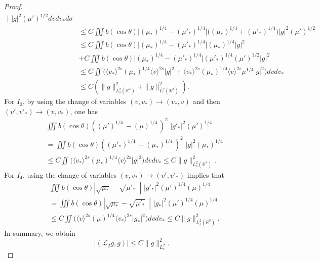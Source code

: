 \documentclass{amsart}[12pt, article]
\begin{document}
\begin{proof}
\begin{align*}
|\,\, |g|^2
(\mu')^{1/2}dv dv_* d\sigma\\
&\leq C  \iiint b(\cos\theta)\Big| (\mu_*)^{1/4} - (\mu'_*)^{1/4}
\Big| \Big( (\mu_*)^{1/4} + (\mu'_*)^{1/4} \Big)
|g|^2 (\mu')^{1/2}\\
&\leq C \iiint b(\cos\theta) \Big|(\mu_*)^{1/4} -
(\mu'_*)^{1/4}\Big|
(\mu_*)^{1/4} |g|^2 \\
&+ C\iiint b(\cos\theta) \Big|(\mu_*)^{1/4} -(\mu'_*)^{1/4}
\Big|(\mu'_*)^{1/4} (\mu')^{1/2}|g|^2\\
&\leq C\iint \Big(\langle v_*\rangle^{2s}(\mu_*)^{1/4} \langle
v\rangle^{2s} |g|^2+\langle v_*\rangle^{2s}(\mu_*)^{1/4} \langle
v\rangle^{2s}\mu^{1/4} |g|^2\Big) dv dv_*\\
&\leq C (\|g\|^2_{L^2_s({{{\mathbb R}}}^3)}+\|g\|^2_{L^2({{{\mathbb R}}}^3)}).
\end{align*}
For $I_2$, by using the change of variables $(v,v_\ast )
\rightarrow (v_*,v)$ and then $(v', v'_\ast ) \rightarrow (v,v_\ast) $, one has
\begin{align*}
 &\iiint b(\cos\theta) \left((\mu')^{1/4}\,
- (\mu)^{1/4}\, \right)^2\,\, |g'_*|^2 (\mu')^{1/4}\\
&= \iiint b(\cos\theta) \left((\mu'_*)^{1/4}\,
- (\mu_*)^{1/4}\, \right)^2\,\, |g|^2 (\mu_*)^{1/4}\\
&\leq C\iint \Big(\langle v_*\rangle^{2s}(\mu_*)^{1/4} \langle
v\rangle^{2s} |g|^2\Big) dv dv_*\leq C \|g\|^2_{L^2_s({{{\mathbb R}}}^3)}.
\end{align*}
For  $I_4$, using the change of variables $(v,v_\ast )\rightarrow (v',v'_\ast )$ implies that
\begin{align*}
 &\iiint b(\cos\theta) \left| \sqrt{\mu_*} -
\sqrt{\mu'_*}\,\, \, \right|\,\, |g'_*|^2 (\mu')^{1/4}(\mu)^{1/4}\\
&= \iiint b(\cos\theta) \left| \sqrt{\mu_*} -
\sqrt{\mu'_*}\,\, \, \right|\,\, |g_*|^2 (\mu')^{1/4}(\mu)^{1/4}\\
&\leq C\iint \Big(\langle v\rangle^{2s}(\mu)^{1/4} \langle
v_*\rangle^{2s} |g_*|^2\Big) dv dv_*\leq C \|g\|^2_{L^2_s({{{\mathbb R}}}^3)}.
\end{align*}
In summary, we obtain
\begin{equation}\label{2.2.7}
|({{\mathcal L}}_2 g , g ) | \leq C \| g\|^2_{L^2_s}.
\end{equation}


\end{proof}
\end{document}
